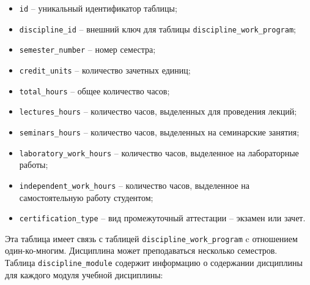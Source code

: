 \begin{itemize}
	\item \texttt{id} -- уникальный идентификатор таблицы;
	\item \texttt{discipline\_id} -- внешний ключ для таблицы \texttt{discipline\_work\_program};
	\item \texttt{semester\_number} -- номер семестра;
	\item \texttt{credit\_units} -- количество зачетных единиц;
	\item \texttt{total\_hours} -- общее количество часов;
	\item \texttt{lectures\_hours} -- количество часов, выделенных для проведения лекций;
	\item \texttt{seminars\_hours} -- количество часов, выделенных на семинарские занятия;
	\item \texttt{laboratory\_work\_hours} -- количество часов, выделенное на лабораторные работы;
	\item \texttt{independent\_work\_hours} -- количество часов, выделенное на самостоятельную работу студентом;
	\item \texttt{certification\_type} -- вид промежуточный аттестации -- экзамен или зачет.
\end{itemize}

Эта таблица имеет связь с таблицей \texttt{discipline\_work\_program} c отношением один-ко-многим. Дисциплина может преподаваться несколько семестров.\\

Таблица \texttt{discipline\_module} содержит информацию о содержании дисциплины для каждого модуля учебной дисциплины:

